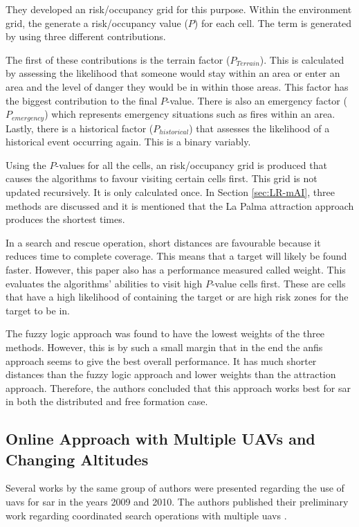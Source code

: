 They developed an risk/occupancy grid for this purpose. Within the environment grid, the generate a risk/occupancy value ($P$) for each cell. The term is generated by using three different contributions.

The first of these contributions is the terrain factor ($P_{Terrain}$). This is calculated by assessing the likelihood that someone would stay within an area or enter an area and the level of danger they would be in within those areas. This factor has the biggest contribution to the final $P$-value. There is also an emergency factor ($P_{emergency}$) which represents emergency situations such as fires within an area. Lastly, there is a historical factor ($P_{historical}$) that assesses the likelihood of a historical event occurring again. This is a binary variably.

Using the $P$-values for all the cells, an risk/occupancy grid is produced that causes the algorithms to favour visiting certain cells first. This grid is not updated recursively. It is only calculated once. In Section \ref{sec:LR-mAI}, three methods are discussed and it is mentioned that the La Palma attraction approach produces the shortest times.

In a search and rescue operation, short distances are favourable because it reduces time to complete coverage. This means that a target will likely be found faster. However, this paper also has a performance measured called weight. This evaluates the algorithms' abilities to visit high $P$-value cells first. These are cells that have a high likelihood of containing the target or are high risk zones for the target to be in.

The fuzzy logic approach was found to have the lowest weights of the three methods. However, this is by such a small margin that in the end the \ac{anfis} approach seems to give the best overall performance. It has much shorter distances than the fuzzy logic approach and lower weights than the attraction approach. Therefore, the authors concluded that this approach works best for \ac{sar} in both the distributed and free formation case. 
\subsection{Online Approach with Multiple UAVs and Changing Altitudes}
\label{sec:LR SAR Decision Theory}
Several works by the same group of authors were presented regarding the use of \acp{uav} for \acl{sar} in the years 2009 and 2010. The authors published their preliminary work regarding coordinated search operations with multiple \acp{uav} \cite{Waharte2009}. 

